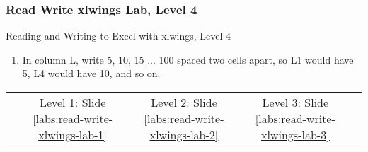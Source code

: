 \documentclass[handout, 11pt]{beamer}
\begin{document}
\begin{frame}
\frametitle{Read Write xlwings Lab, Level 4}
{
\begin{block}{Reading and Writing to Excel with xlwings, Level 4}
\begin{enumerate}
\item In column L, write 5, 10, 15 ... 100 spaced two cells apart, so L1 would have 5, L4 would have 10, and so on.
\end{enumerate}
\vfill
\begin{tabular*}{\textwidth}{@{\extracolsep{\fill}}ccccc}
\toprule
\hfill & Level 1: Slide \textcolor{blue}{\underline{\ref{labs:read-write-xlwings-lab-1}}} & Level 2: Slide \textcolor{blue}{\underline{\ref{labs:read-write-xlwings-lab-2}}} & Level 3: Slide \textcolor{blue}{\underline{\ref{labs:read-write-xlwings-lab-3}}} & \hfill\\

\end{tabular*}
\end{block}
}
\label{labs:read-write-xlwings-lab-4}
\end{frame}
\setcounter{framenumber}{\value{finalframe}}
\end{document}
